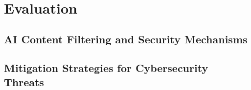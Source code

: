 \chapter{Evaluation \label{cha:eva}}

\section{AI Content Filtering and Security Mechanisms}

\section{Mitigation Strategies for Cybersecurity Threats}
